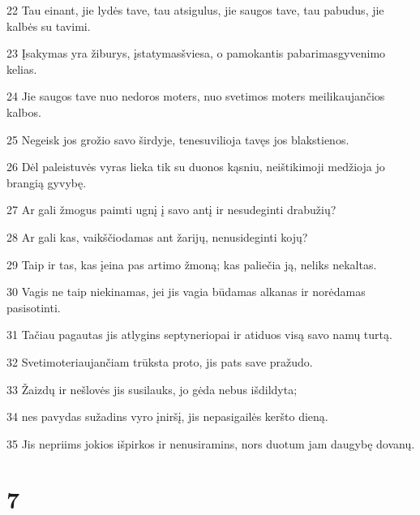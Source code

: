 \par 22 Tau einant, jie lydės tave, tau atsigulus, jie saugos tave, tau pabudus, jie kalbės su tavimi. 
\par 23 Įsakymas yra žiburys, įstatymas­šviesa, o pamokantis pabarimas­gyvenimo kelias. 
\par 24 Jie saugos tave nuo nedoros moters, nuo svetimos moters meilikaujančios kalbos. 
\par 25 Negeisk jos grožio savo širdyje, tenesuvilioja tavęs jos blakstienos. 
\par 26 Dėl paleistuvės vyras lieka tik su duonos kąsniu, neištikimoji medžioja jo brangią gyvybę. 
\par 27 Ar gali žmogus paimti ugnį į savo antį ir nesudeginti drabužių? 
\par 28 Ar gali kas, vaikščiodamas ant žarijų, nenusideginti kojų? 
\par 29 Taip ir tas, kas įeina pas artimo žmoną; kas paliečia ją, neliks nekaltas. 
\par 30 Vagis ne taip niekinamas, jei jis vagia būdamas alkanas ir norėdamas pasisotinti. 
\par 31 Tačiau pagautas jis atlygins septyneriopai ir atiduos visą savo namų turtą. 
\par 32 Svetimoteriaujančiam trūksta proto, jis pats save pražudo. 
\par 33 Žaizdų ir nešlovės jis susilauks, jo gėda nebus išdildyta; 
\par 34 nes pavydas sužadins vyro įniršį, jis nepasigailės keršto dieną. 
\par 35 Jis nepriims jokios išpirkos ir nenusiramins, nors duotum jam daugybę dovanų.



\chapter{7}



